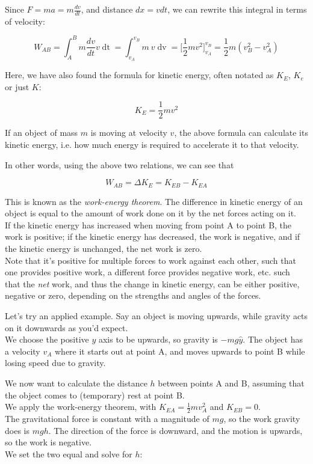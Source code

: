 \documentclass[12pt,a4paper]{report}
\begin{document}
Since $\displaystyle F = m a = m \frac{dv}{dt}$, and distance $dx = v dt$, we can rewrite this integral in terms of velocity:

\begin{equation}
W_{AB} = \int_A^B m \frac{dv}{dt} v \mathop{dt} = \int_{v_A}^{v_B} m\ v \mathop{dv} = \Big[ \frac{1}{2} m v^2 \Big]_{v_A}^{v_B} = \frac{1}{2} m \left(v_B^2 - v_A^2\right)
\end{equation}

Here, we have also found the formula for kinetic energy, often notated as $K_E$, $K_e$ or just $K$:

\begin{equation}
K_E = \frac{1}{2} m v^2
\end{equation}

If an object of mass $m$ is moving at velocity $v$, the above formula can calculate its kinetic energy, i.e. how much energy is required to accelerate it to that velocity.

In other words, using the above two relations, we can see that

\begin{equation}
W_{AB} = \Delta K_E = K_{EB} - K_{EA}
\end{equation}

This is known as the \emph{work-energy theorem}. The difference in kinetic energy of an object is equal to the amount of work done on it by the net forces acting on it.\\
If the kinetic energy has increased when moving from point A to point B, the work is positive; if the kinetic energy has decreased, the work is negative, and if the kinetic energy is unchanged, the net work is zero.\\
Note that it's positive for multiple forces to work against each other, such that one provides positive work, a different force provides negative work, etc. such that the \emph{net} work, and thus the change in kinetic energy, can be either positive, negative or zero, depending on the strengths and angles of the forces.

Let's try an applied example. Say an object is moving upwards, while gravity acts on it downwards as you'd expect.\\
We choose the positive $y$ axis to be upwards, so gravity is $-mg\hat{y}$. The object has a velocity $v_A$ where it starts out at point A, and moves upwards to point B while losing speed due to gravity.

We now want to calculate the distance $h$ between points A and B, assuming that the object comes to (temporary) rest at point B.\\
We apply the work-energy theorem, with $\displaystyle K_{EA} = \frac{1}{2} m v_A^2$ and $K_{EB} = 0$.\\
The gravitational force is constant with a magnitude of $m g$, so the work gravity does is $m g h$. The direction of the force is downward, and the motion is upwards, so the work is negative.\\
We set the two equal and solve for $h$:
\end{document}
